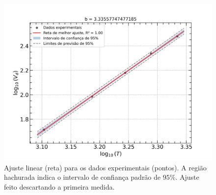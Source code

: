 \documentclass[12pt,a4paper]{article}
\begin{document}
\begin{enumerate}
    \begin{figure}[htp!]
            \centering
            \includegraphics[width=1.00\linewidth]{Figures/Fit_logVdxlogT_f.png}
            \caption{Ajuste linear (reta) para os dados experimentais (pontos). A região hachurada indica o intervalo de confiança padrão de $95\%$. Ajuste feito descartando a primeira medida.}
            \label{fig:Fit_logVdxlogT_f}
    \end{figure}
    
    



\end{enumerate}
\end{document}
